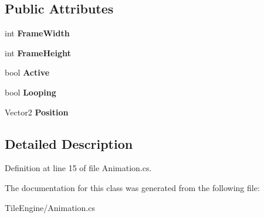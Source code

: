 \subsection*{Public Attributes}
\begin{DoxyCompactItemize}
\item 
\hypertarget{class_tile_engine_1_1_animation_a6144d8d5c904bfd318a0f1891f68d31a}{int {\bfseries Frame\-Width}}\label{class_tile_engine_1_1_animation_a6144d8d5c904bfd318a0f1891f68d31a}

\item 
\hypertarget{class_tile_engine_1_1_animation_ad6d0570216f225b5965bdf25ae1ff92a}{int {\bfseries Frame\-Height}}\label{class_tile_engine_1_1_animation_ad6d0570216f225b5965bdf25ae1ff92a}

\item 
\hypertarget{class_tile_engine_1_1_animation_a428519a2f385fb1eb29ffa3852c5a505}{bool {\bfseries Active}}\label{class_tile_engine_1_1_animation_a428519a2f385fb1eb29ffa3852c5a505}

\item 
\hypertarget{class_tile_engine_1_1_animation_a22b62fda1e3fdb5cc1d20203b72362cb}{bool {\bfseries Looping}}\label{class_tile_engine_1_1_animation_a22b62fda1e3fdb5cc1d20203b72362cb}

\item 
\hypertarget{class_tile_engine_1_1_animation_a75d52f1bc2b67d0bc012ad6569bfe006}{Vector2 {\bfseries Position}}\label{class_tile_engine_1_1_animation_a75d52f1bc2b67d0bc012ad6569bfe006}

\end{DoxyCompactItemize}


\subsection{Detailed Description}


Definition at line 15 of file Animation.\-cs.



The documentation for this class was generated from the following file\-:\begin{DoxyCompactItemize}
\item 
Tile\-Engine/Animation.\-cs\end{DoxyCompactItemize}
